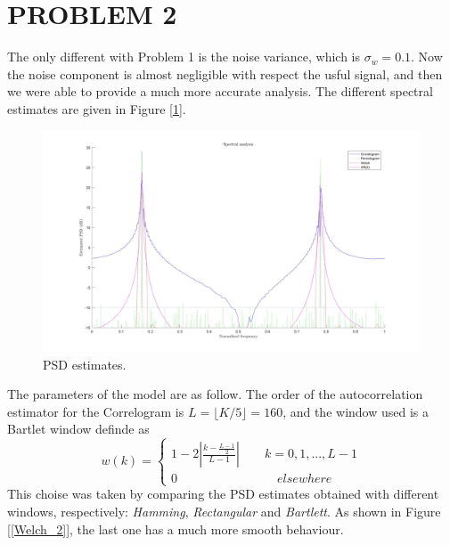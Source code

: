 \documentclass[a4paper,11pt,openright,twoside]{report}
\begin{document}
\clearpage
\section*{PROBLEM 2}
The only different with Problem 1 is the noise variance, which is $\sigma_w=0.1$. Now the noise component is almost negligible with respect the usful signal, and then we were able to provide a much more accurate analysis. The different spectral estimates are given in Figure [\ref{PSD_2}]. \\

\begin{figure}[h!]
	\centering
	\includegraphics[width=14cm]{images/PSD_2.jpg}
	\caption{PSD estimates.}\label{PSD_2} 
\end{figure}

The parameters of the model are as follow. The order of the autocorrelation estimator for the Correlogram is $ L = \lfloor K/5 \rfloor = 160 $, and the window used is a Bartlet window definde as
\begin{equation}\label{Bart}
w(k) = \begin{cases}
1-2 \left | \frac{k-\frac{L-1}{2}}{L-1} \right | \quad \quad k=0,1,...,L-1 \\
0 \quad \quad \quad \quad \quad \quad \quad \quad  elsewhere
\end{cases}
\end{equation} 
This choise was taken by comparing the PSD estimates obtained with different windows, respectively: \textit{Hamming}, \textit{Rectangular} and \textit{Bartlett}. As shown in Figure [\ref{Welch_2}], the last one has a much more smooth behaviour.
\end{document}
